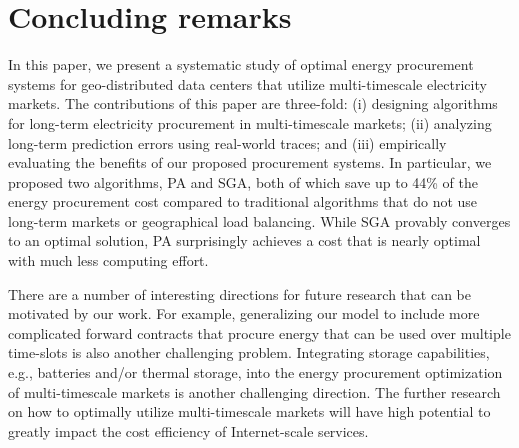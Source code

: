 \section{Concluding remarks}

In this paper, we present a systematic study of optimal energy procurement systems for geo-distributed data centers that utilize multi-timescale electricity markets. The contributions of this paper are three-fold: (i) designing algorithms for long-term electricity procurement in multi-timescale markets; (ii) analyzing  long-term prediction errors using real-world traces; and (iii)  empirically evaluating the benefits of our proposed procurement systems. In particular, we proposed two algorithms, PA and SGA, both of which save up to 44\% of the energy procurement cost compared to traditional algorithms that do not use long-term markets or geographical load balancing.  While SGA provably converges to an optimal solution, PA surprisingly achieves a cost that is nearly optimal with much less computing effort. 

There are a number of interesting directions for future research that can be motivated by our work. For example, generalizing our model to include more complicated forward contracts that procure energy that can be used over multiple time-slots is also another challenging problem. Integrating storage capabilities, e.g., batteries and/or thermal storage, into the energy procurement optimization of multi-timescale markets is another challenging direction. The further research on how to optimally utilize multi-timescale markets will have high potential to greatly impact the cost efficiency of Internet-scale services.

\label{EndOfPaper}